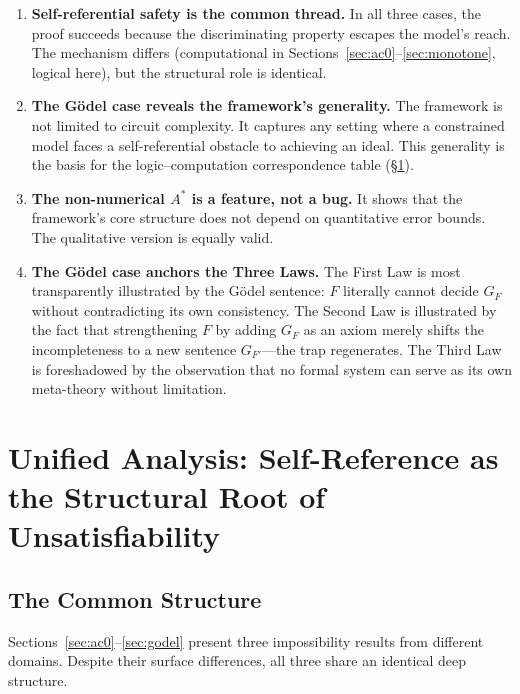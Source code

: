 \documentclass[11pt,a4paper]{article}
\theoremstyle{plain}
\theoremstyle{definition}
\theoremstyle{remark}
\begin{document}
\begin{enumerate}
\item \textbf{Self-referential safety is the common thread.} In all three cases, the proof succeeds because the discriminating property escapes the model's reach. The mechanism differs (computational in Sections~\ref{sec:ac0}--\ref{sec:monotone}, logical here), but the structural role is identical.

\item \textbf{The G\"{o}del case reveals the framework's generality.} The framework is not limited to circuit complexity. It captures any setting where a constrained model faces a self-referential obstacle to achieving an ideal. This generality is the basis for the logic--computation correspondence table (\S\ref{sec:unified}).

\item \textbf{The non-numerical $A^*$ is a feature, not a bug.} It shows that the framework's core structure does not depend on quantitative error bounds. The qualitative version is equally valid.

\item \textbf{The G\"{o}del case anchors the Three Laws.} The First Law is most transparently illustrated by the G\"{o}del sentence: $F$ literally cannot decide $G_F$ without contradicting its own consistency. The Second Law is illustrated by the fact that strengthening $F$ by adding $G_F$ as an axiom merely shifts the incompleteness to a new sentence $G_{F'}$---the trap regenerates. The Third Law is foreshadowed by the observation that no formal system can serve as its own meta-theory without limitation.
\end{enumerate}

\section{Unified Analysis: Self-Reference as the Structural Root of Unsatisfiability}
\label{sec:unified}

\subsection{The Common Structure}

Sections~\ref{sec:ac0}--\ref{sec:godel} present three impossibility results from different domains. Despite their surface differences, all three share an identical deep structure.
\end{document}
